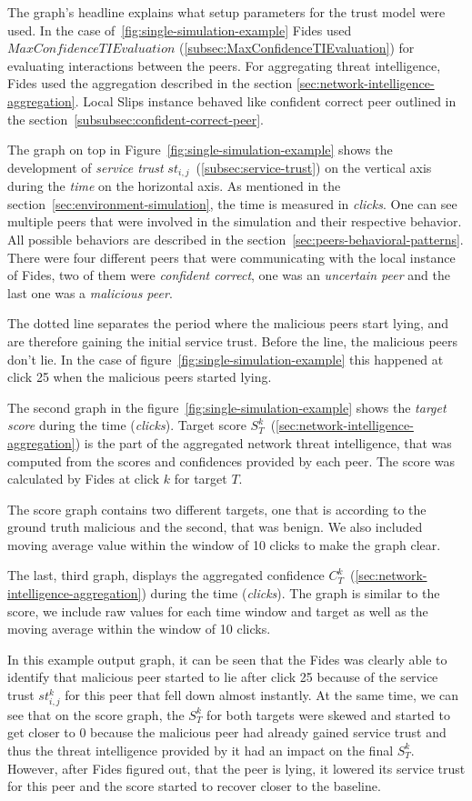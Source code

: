 The graph's headline explains what setup parameters for the trust model were used. In the case of~\ref{fig:single-simulation-example} Fides used $MaxConfidenceTIEvaluation$ (\ref{subsec:MaxConfidenceTIEvaluation}) for evaluating interactions between the peers.
For aggregating threat intelligence, Fides used the aggregation described in the section \ref{sec:network-intelligence-aggregation}.
Local Slips instance behaved like confident correct peer outlined in the section~\ref{subsubsec:confident-correct-peer}.

The graph on top in Figure~\ref{fig:single-simulation-example} shows the development of \textit{service trust} $st_{i, j}$~(\ref{subsec:service-trust}) on the vertical axis during the \textit{time} on the horizontal axis. As mentioned in the section~\ref{sec:environment-simulation}, the time is measured in \textit{clicks}.
One can see multiple peers that were involved in the simulation and their respective behavior. All possible behaviors are described in the section~\ref{sec:peers-behavioral-patterns}.
There were four different peers that were communicating with the local instance of Fides, two of them were \textit{confident correct}, one was an \textit{uncertain peer} and the last one was a \textit{malicious peer}.

The dotted line separates the period where the malicious peers start lying, and are therefore gaining the initial service trust. Before the line, the malicious peers don't lie.
In the case of figure~\ref{fig:single-simulation-example} this happened at click 25 when the malicious peers started lying.

The second graph in the figure~\ref{fig:single-simulation-example} shows the \textit{target score} during the time (\textit{clicks}).
Target score $S^{k}_{T}$~(\ref{sec:network-intelligence-aggregation}) is the part of the aggregated network threat intelligence, that was computed from the scores and confidences provided by each peer.
The score was calculated by Fides at click $k$ for target $T$.

The score graph contains two different targets, one that is according to the ground truth malicious and the second, that was benign.
We also included moving average value within the window of 10 clicks to make the graph clear.

The last, third graph, displays the aggregated confidence $C^{k}_{T}$~(\ref{sec:network-intelligence-aggregation}) during the time (\textit{clicks}).
The graph is similar to the score, we include raw values for each time window and target as well as the moving average within the window of 10 clicks.

In this example output graph, it can be seen that the Fides was clearly able to identify that malicious peer started to lie after click 25 because of the service trust $st^{k}_{i,j}$ for this peer that fell down almost instantly.
At the same time, we can see that on the score graph, the $S^{k}_{T}$ for both targets were skewed and started to get closer to $0$ because the malicious peer had already gained service trust and thus the threat intelligence provided by it had an impact on the final $S^{k}_{T}$.
However, after Fides figured out, that the peer is lying, it lowered its service trust for this peer and the score started to recover closer to the baseline.